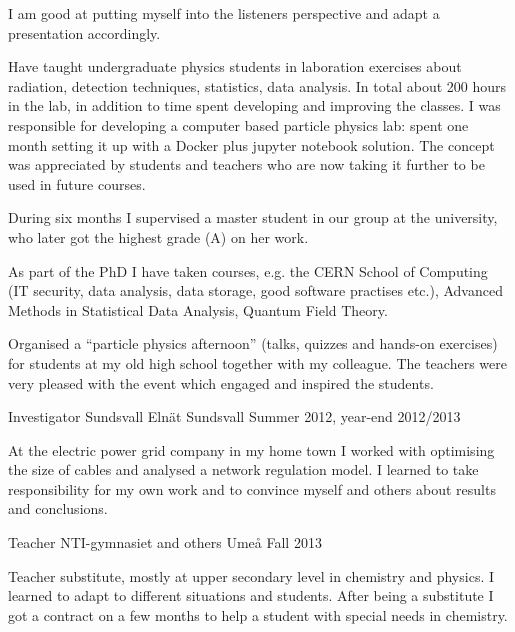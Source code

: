 \begin{cventries}
{\begin{cvitems}
{	I am good at putting myself into the listeners perspective and adapt a presentation accordingly.
}
\item {Have taught undergraduate physics students in laboration exercises about radiation, detection techniques, statistics, data analysis. 
       In total about 200 hours in the lab, in addition to time spent developing and improving the classes.
       I was responsible for developing a computer based particle physics lab: spent one month setting it up with a Docker plus jupyter notebook solution.
       The concept was appreciated by students and teachers who are now taking it further to be used in future courses.
}
\item {During six months I supervised a master student in our group at the university, who later got the highest grade (A) on her work.
}
\item {As part of the PhD I have taken courses, e.g. the CERN School of Computing (IT security, data analysis, data storage, good software practises etc.), Advanced Methods in Statistical Data Analysis, Quantum Field Theory.
}
\item {Organised a ``particle physics afternoon'' (talks, quizzes and hands-on exercises) for students at my old high school together with my colleague.
         The teachers were very pleased with the event which engaged and inspired the students.
}
\end{cvitems}
}



\cventry
{Investigator} %
{Sundsvall Eln\"{a}t} %
{Sundsvall} %
{Summer 2012, year-end 2012/2013} %
{ %
\begin{cvitems}
\item {At the electric power grid company in my home town I worked with optimising the size of cables and analysed a network regulation model. 
		 I learned to take responsibility for my own work and to convince myself and others about results and conclusions. 
}
\end{cvitems}
}


\cventry
{Teacher} %
{NTI-gymnasiet and others} %
{Ume{\aa}} %
{Fall 2013} %
{ %
\begin{cvitems}
\item {Teacher substitute, mostly at upper secondary level in chemistry and physics. 
		I learned to adapt to different situations and students. 
		After being a substitute I got a contract on a few months to help a student with special needs in chemistry.
		 }
\end{cvitems}
}


\end{cventries}
